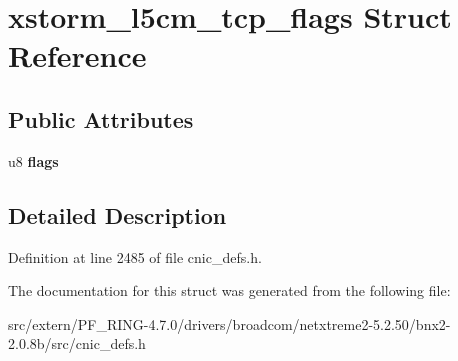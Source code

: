 \hypertarget{structxstorm__l5cm__tcp__flags}{
\section{xstorm\_\-l5cm\_\-tcp\_\-flags Struct Reference}
\label{structxstorm__l5cm__tcp__flags}
}
\subsection*{Public Attributes}
\begin{DoxyCompactItemize}
\item 
\hypertarget{structxstorm__l5cm__tcp__flags_ade22149345333fbcb40db8cfb0855f82}{
u8 {\bfseries flags}}
\label{structxstorm__l5cm__tcp__flags_ade22149345333fbcb40db8cfb0855f82}

\end{DoxyCompactItemize}


\subsection{Detailed Description}


Definition at line 2485 of file cnic\_\-defs.h.



The documentation for this struct was generated from the following file:\begin{DoxyCompactItemize}
\item 
src/extern/PF\_\-RING-\/4.7.0/drivers/broadcom/netxtreme2-\/5.2.50/bnx2-\/2.0.8b/src/cnic\_\-defs.h\end{DoxyCompactItemize}
